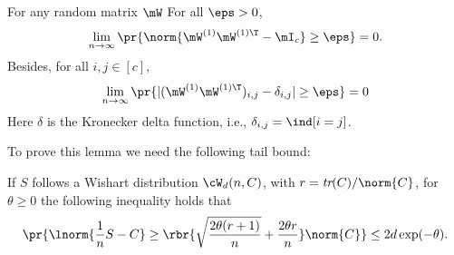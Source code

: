 \begin{lemma}
\label{lemma:WW-identity}
For any random matrix $\mW$
For all $\eps>0$,
\begin{equation}
    \lim_{n\to\infty}\pr{\norm{\mW^{(1)}\mW^{(1)\T}-\mI_c}\geq\eps}=0.
\end{equation}Besides, for all $i,j\in[c]$, 
\begin{equation}
    \lim_{n\to\infty}\pr{|(\mW^{(1)}\mW^{(1)\T})_{i,j}-\delta_{i,j}|\geq\eps}=0
\end{equation}
Here $\delta$ is the Kronecker delta function, i.e., $\delta_{i,j} = \ind[i=j]$.
\end{lemma}
\begin{proofof}{}
To prove this lemma we need the following tail bound:
\begin{lemma}\citep{zhu2012short} If $S$ follows a Wishart distribution $\cW_d(n,C)$, with $r = \emph{tr}(C)/\norm{C}$, for $\theta\geq 0$ the following inequality holds that \begin{equation}
    \pr{\lnorm{\frac1n S-C}\geq \rbr{\sqrt{\frac{2\theta(r+1)}{n}}+\frac{2\theta r}{n}}\norm{C}}\leq 2d\exp(-\theta).
\end{equation}
\label{lemma:W-wishart}
\end{lemma}


\end{proofof}
